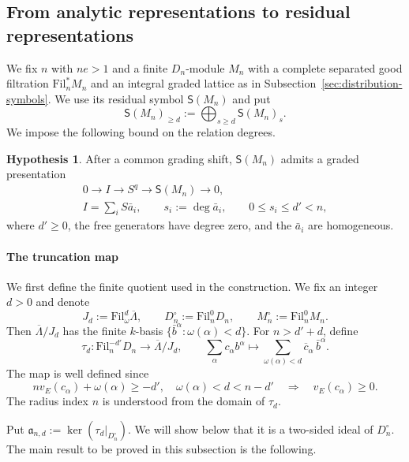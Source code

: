 \documentclass[11pt]{article}
\theoremstyle{definition}
\newtheorem{hypothesis}[theorem]{Hypothesis}
\begin{document}
\subsection{From analytic representations to residual representations}
\label{sec:analytic-to-residual}

We fix $n$ with $ne>1$ and a finite $D_n$-module $M_n$ with a complete
separated good filtration $\mathrm{Fil}_n^*M_n$ and an integral graded lattice
as in Subsection~\ref{sec:distribution-symbols}. We use its residual
symbol $\mathsf S(M_n)$ and put
\[
 \mathsf S(M_n)_{\geq d}
       :=\bigoplus_{s\geq d}\mathsf S(M_n)_s.
\]
We impose the following bound on the relation degrees.

\begin{hypothesis}
After a common grading shift, $\mathsf S(M_n)$ admits a graded presentation
\begin{equation}\label{eq:jet-bounded-presentation}
 \begin{gathered}
 0\longrightarrow I\longrightarrow S^{q}\longrightarrow\mathsf S(M_n)
     \longrightarrow0,\\
 I=\sum_iS\bar a_i,\qquad
 s_i:=\deg\bar a_i,\qquad 0\leq s_i\leq d'<n,
 \end{gathered}
\end{equation}
where $d'\geq0$, the free generators have degree zero, and the $\bar a_i$
are homogeneous.
\end{hypothesis}

\paragraph{The truncation map}
We first define the finite quotient used in the construction.
We fix an integer $d>0$ and denote
\[
 J_d:=\mathrm{Fil}_\omega^d\overline\Lambda,\qquad
 D_n^\circ:=\mathrm{Fil}_n^0D_n,\qquad M_n^\circ:=\mathrm{Fil}_n^0M_n.
\]
Then $\overline{\Lambda}/J_d$ has the finite $k$-basis
$\{\bar b^\alpha:\omega(\alpha)<d\}$. For $n>d'+d$, define
\[
 \tau_d:\mathrm{Fil}_n^{-d'}D_n\longrightarrow \overline{\Lambda}/J_d,
 \qquad
 \sum_\alpha c_\alpha b^\alpha\longmapsto
 \sum_{\omega(\alpha)<d}\overline{c}_\alpha\,\bar b^\alpha.
\]
The map is well defined since
\[
 nv_E(c_\alpha)+\omega(\alpha)\geq-d',\quad\omega(\alpha)<d<n-d'
 \quad\Longrightarrow\quad v_E(c_\alpha)\geq0.
\]
The radius index $n$ is understood from the domain of $\tau_d$.

Put $\mathfrak a_{n,d}:=\ker(\tau_d|_{D_n^\circ})$. We will show below
that it is a two-sided ideal of $D_n^\circ$. The main result to be proved in this
subsection is the following.
\end{document}
